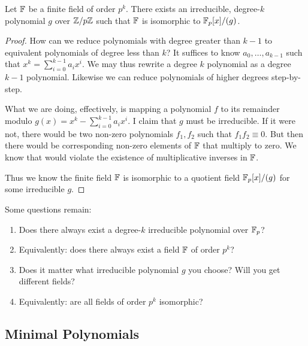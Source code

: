 \begin{theorem}
  Let $\mathbb{F}$ be a finite field of order $p^k$. There exists an
  irreducible, degree-$k$ polynomial $g$ over $\mathbb{Z} / p\mathbb{Z}$ such that $\mathbb{F}$ is
  isomorphic to $\mathbb{F}_p[x]/(g)$.
\end{theorem}

\begin{proof}
  How can we reduce polynomials with degree greater than $k-1$ to
  equivalent polynomials of degree less than $k$? It suffices to know
  $a_0, \ldots, a_{k-1}$ such that $x^k = \sum_{i=0}^{k-1} a_i x^i$. We
  may thus rewrite a degree $k$ polynomial as a degree $k-1$ polynomial.
  Likewise we can reduce polynomials of higher degrees step-by-step.

  What we are doing, effectively, is mapping a polynomial $f$ to its
  remainder modulo $g(x) = x^k - \sum_{i=0}^{k-1} a_i x^i$. I claim that
  $g$ must be irreducible. If it were not, there would be two non-zero
  polynomials $f_1, f_2$ such that $f_1 f_2 \equiv 0$. But then there
  would be corresponding non-zero elements of $\mathbb{F}$ that multiply to
  zero. We know that would violate the existence of multiplicative
  inverses in $\mathbb{F}$.

  Thus we know the finite field $\mathbb{F}$ is isomorphic to a quotient field
  $\mathbb{F}_p[x]/(g)$ for some irreducible $g$.
\end{proof}

\begin{remark}
  Some questions remain:

  \begin{enumerate}
    \item Does there always exist a degree-$k$ irreducible polynomial
    over $\mathbb{F}_p$?

    \item Equivalently: does there always exist a field $\mathbb{F}$ of order
    $p^k$?

    \item Does it matter what irreducible polynomial $g$ you choose?
    Will you get different fields?

    \item Equivalently: are all fields of order $p^k$ isomorphic?
  \end{enumerate}
\end{remark}

\subsection{Minimal Polynomials}


